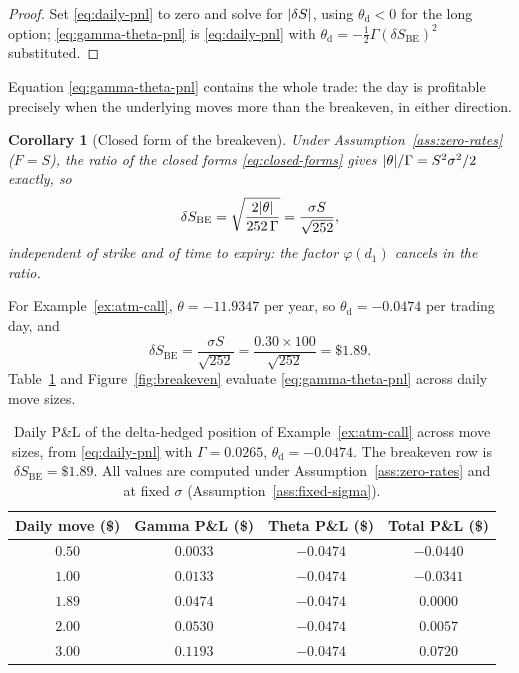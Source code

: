 \documentclass[11pt]{book}
\theoremstyle{plain}
\newtheorem{corollary}[theorem]{Corollary}
\theoremstyle{definition}
\theoremstyle{remark}
\newcommand{\npdf}{\varphi}                      %
\DeclarePairedDelimiter{\abs}{\lvert}{\rvert}
\begin{document}
\begin{proof}
Set \eqref{eq:daily-pnl} to zero and solve for $\abs{\delta S}$, using $\theta_{\mathrm d} < 0$ for the long option; \eqref{eq:gamma-theta-pnl} is \eqref{eq:daily-pnl} with $\theta_{\mathrm d} = -\tfrac12\Gamma(\delta S_{\mathrm{BE}})^2$ substituted.
\end{proof}

Equation \eqref{eq:gamma-theta-pnl} contains the whole trade: the day is profitable precisely when the underlying moves more than the breakeven, in either direction.

\begin{corollary}[Closed form of the breakeven]
\label{cor:breakeven-closed}
Under Assumption~\ref{ass:zero-rates} ($F = S$), the ratio of the closed forms \eqref{eq:closed-forms} gives $\abs{\theta}/\Gamma = S^2\sigma^2/2$ exactly, so
\begin{equation}
\delta S_{\mathrm{BE}} = \sqrt{\frac{2\abs{\theta}}{252\,\Gamma}} = \frac{\sigma S}{\sqrt{252}},
\label{eq:breakeven-closed}
\end{equation}
independent of strike and of time to expiry: the factor $\npdf(d_1)$ cancels in the ratio.
\end{corollary}

For Example~\ref{ex:atm-call}, $\theta = -11.9347$ per year, so $\theta_{\mathrm d} = -0.0474$ per trading day, and
\begin{equation}
\delta S_{\mathrm{BE}} = \frac{\sigma S}{\sqrt{252}} = \frac{0.30 \times 100}{\sqrt{252}} = \$1.89 .
\end{equation}
Table~\ref{tab:breakeven-analysis} and Figure~\ref{fig:breakeven} evaluate \eqref{eq:gamma-theta-pnl} across daily move sizes.

\begin{table}[t]
\centering
\begin{tabular}{@{}cccc@{}}
\toprule
\textbf{Daily move (\$)} & \textbf{Gamma P\&L (\$)} & \textbf{Theta P\&L (\$)} & \textbf{Total P\&L (\$)} \\
\midrule
$0.50$ & $0.0033$ & $-0.0474$ & $-0.0440$ \\
$1.00$ & $0.0133$ & $-0.0474$ & $-0.0341$ \\
$1.89$ & $0.0474$ & $-0.0474$ & $0.0000$ \\
$2.00$ & $0.0530$ & $-0.0474$ & $0.0057$ \\
$3.00$ & $0.1193$ & $-0.0474$ & $0.0720$ \\
\bottomrule
\end{tabular}
\caption{Daily P\&L of the delta-hedged position of Example~\ref{ex:atm-call} across move sizes, from \eqref{eq:daily-pnl} with $\Gamma = 0.0265$, $\theta_{\mathrm d} = -0.0474$. The breakeven row is $\delta S_{\mathrm{BE}} = \$1.89$. All values are computed under Assumption~\ref{ass:zero-rates} and at fixed $\sigma$ (Assumption~\ref{ass:fixed-sigma}).}
\label{tab:breakeven-analysis}
\end{table}
\end{document}
